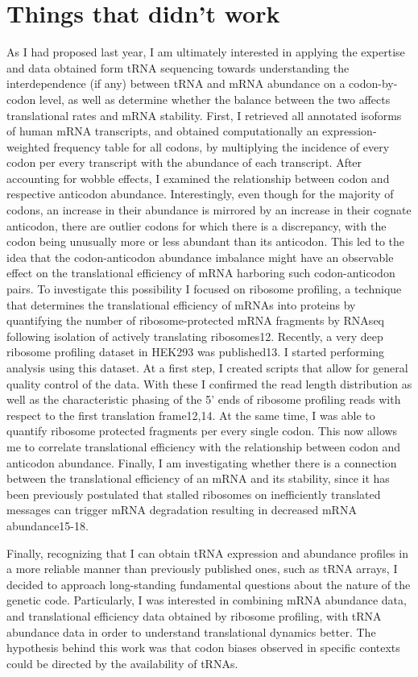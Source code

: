 \documentclass[12pt]{rockefeller}
\begin{document}
\chapter{Things that didn't work}
As I had proposed last year, I am ultimately interested in applying the expertise and data obtained form tRNA sequencing towards understanding the interdependence (if any) between tRNA and mRNA abundance on a codon-by-codon level, as well as determine whether the balance between the two affects translational rates and mRNA stability. First, I retrieved all annotated isoforms of human mRNA transcripts, and obtained computationally an expression-weighted frequency table for all codons, by multiplying the incidence of every codon per every transcript with the abundance of each transcript. After accounting for wobble effects, I examined the relationship between codon and respective anticodon abundance. Interestingly, even though for the majority of codons, an increase in their abundance is mirrored by an increase in their cognate anticodon, there are outlier codons for which there is a discrepancy, with the codon being unusually more or less abundant than its anticodon. This led to the idea that the codon-anticodon abundance imbalance might have an observable effect on the translational efficiency of mRNA harboring such codon-anticodon pairs. To investigate this possibility I focused on ribosome profiling, a technique that determines the translational efficiency of mRNAs into proteins by quantifying the number of ribosome-protected mRNA fragments by RNAseq following isolation of actively translating ribosomes12. Recently, a very deep ribosome profiling dataset in HEK293 was published13. I started performing analysis using this dataset. At a first step, I created scripts that allow for general quality control of the data. With these I confirmed the read length distribution as well as the characteristic phasing of the 5’ ends of ribosome profiling reads with respect to the first translation frame12,14. At the same time, I was able to quantify ribosome protected fragments per every single codon. This now allows me to correlate translational efficiency with the relationship between codon and anticodon abundance. 
	Finally, I am investigating whether there is a connection between the translational efficiency of an mRNA and its stability, since it has been previously postulated that stalled ribosomes on inefficiently translated messages can trigger mRNA degradation resulting in decreased mRNA abundance15-18. 

Finally, recognizing that I can obtain tRNA expression and abundance profiles in a more reliable manner than previously published ones, such as tRNA arrays, I decided to approach long-standing fundamental questions about the nature of the genetic code. Particularly, I was interested in combining mRNA abundance data, and translational efficiency data obtained by ribosome profiling, with tRNA abundance data in order to understand translational dynamics better. The hypothesis behind this work was that codon biases observed in specific contexts could be directed by the availability of tRNAs. 
\end{document}
